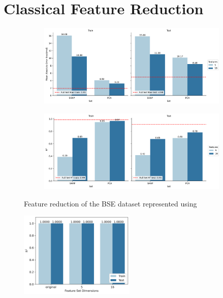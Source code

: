 \documentclass[journal=jacsat,manuscript=article]{achemso}
\begin{document}
\section{Classical Feature Reduction}\label{section:feature_reduction}

\begin{figure}[H]
	\centering	
	\begin{subfigure}[b]{0.49\textwidth}
		\centering
		\includegraphics[width=\textwidth]{../images/BSE/classical_features_MAE.png}
		\caption{}
		\label{fig:BSE_bse_classical_features_MAE}
	\end{subfigure}
	\hfill		
	\begin{subfigure}[b]{0.49\textwidth}
		\centering
		\includegraphics[width=\textwidth]{../images/BSE/classical_features_R2.png}
		\caption{}
		\label{fig:BSE_classical_features_R2}
	\end{subfigure}
	\caption{Feature reduction of the BSE dataset represented using }
	\label{fig:bse_classical_features}
\end{figure}

\begin{figure}[H]
	\centering
	\includegraphics[width=0.49\textwidth]{../images/DDCC/DDCC_feature_set.png}
	\caption{}
	\label{fig:DDCC_feature_set}
\end{figure}
\end{document}

